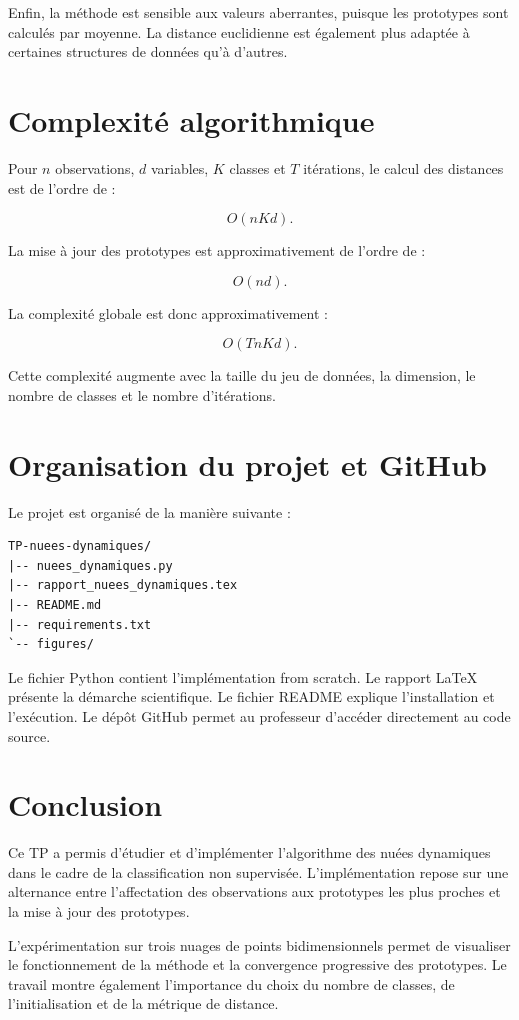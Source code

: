 \documentclass[12pt,a4paper]{article}
\begin{document}
Enfin, la méthode est sensible aux valeurs aberrantes, puisque les prototypes sont calculés par moyenne. La distance euclidienne est également plus adaptée à certaines structures de données qu'à d'autres.

\section{Complexité algorithmique}

Pour $n$ observations, $d$ variables, $K$ classes et $T$ itérations, le calcul des distances est de l'ordre de :

\[
O(nKd).
\]

La mise à jour des prototypes est approximativement de l'ordre de :

\[
O(nd).
\]

La complexité globale est donc approximativement :

\[
O(TnKd).
\]

Cette complexité augmente avec la taille du jeu de données, la dimension, le nombre de classes et le nombre d'itérations.

\section{Organisation du projet et GitHub}

Le projet est organisé de la manière suivante :

\begin{verbatim}
TP-nuees-dynamiques/
|-- nuees_dynamiques.py
|-- rapport_nuees_dynamiques.tex
|-- README.md
|-- requirements.txt
`-- figures/
\end{verbatim}

Le fichier Python contient l'implémentation from scratch. Le rapport LaTeX présente la démarche scientifique. Le fichier README explique l'installation et l'exécution. Le dépôt GitHub permet au professeur d'accéder directement au code source.

\section{Conclusion}

Ce TP a permis d'étudier et d'implémenter l'algorithme des nuées dynamiques dans le cadre de la classification non supervisée. L'implémentation repose sur une alternance entre l'affectation des observations aux prototypes les plus proches et la mise à jour des prototypes.

L'expérimentation sur trois nuages de points bidimensionnels permet de visualiser le fonctionnement de la méthode et la convergence progressive des prototypes. Le travail montre également l'importance du choix du nombre de classes, de l'initialisation et de la métrique de distance.
\end{document}
